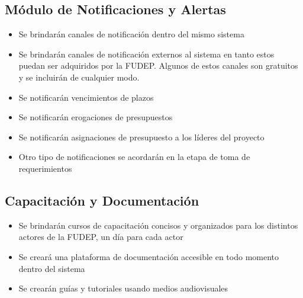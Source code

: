 \subsection{Módulo de Notificaciones y Alertas}
\begin{itemize}
    \item Se brindarán canales de notificación dentro del mismo sistema
    \item Se brindarán canales de notificación externos al sistema en tanto estos puedan ser adquiridos por la FUDEP. Algunos de estos canales son gratuitos y se incluirán de cualquier modo.
    \item Se notificarán vencimientos de plazos
    \item Se notificarán erogaciones de presupuestos
    \item Se notificarán asignaciones de presupuesto a los líderes del proyecto
    \item Otro tipo de notificaciones se acordarán en la etapa de toma de requerimientos
\end{itemize}

\subsection{Capacitación y Documentación}
\begin{itemize}
    \item Se brindarán cursos de capacitación concisos y organizados para los distintos actores de la FUDEP, un día para cada actor
    \item Se creará una plataforma de documentación accesible en todo momento dentro del sistema
    \item Se crearán guías y tutoriales usando medios audiovisuales
\end{itemize}
